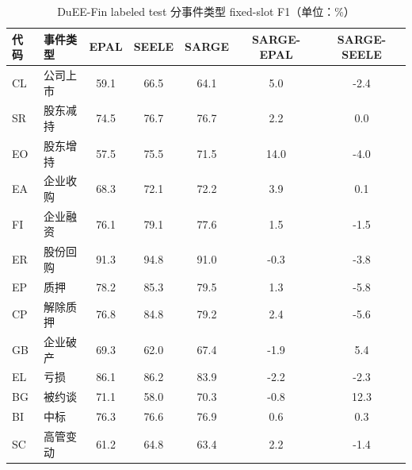 \begin{table}[htbp]
\centering
\caption{DuEE-Fin labeled test 分事件类型 fixed-slot F1（单位：\%）}
\label{tab:dueefin-events}
\small
\begin{tabular}{llSSSSS}
\toprule
代码 & 事件类型 & {EPAL} & {SEELE} & {SARGE} & {SARGE-EPAL} & {SARGE-SEELE} \\
\midrule
CL & 公司上市 & 59.1 & 66.5 & 64.1 & 5.0 & -2.4 \\
SR & 股东减持 & 74.5 & 76.7 & 76.7 & 2.2 & 0.0 \\
EO & 股东增持 & 57.5 & 75.5 & 71.5 & 14.0 & -4.0 \\
EA & 企业收购 & 68.3 & 72.1 & 72.2 & 3.9 & 0.1 \\
FI & 企业融资 & 76.1 & 79.1 & 77.6 & 1.5 & -1.5 \\
ER & 股份回购 & 91.3 & 94.8 & 91.0 & -0.3 & -3.8 \\
EP & 质押 & 78.2 & 85.3 & 79.5 & 1.3 & -5.8 \\
CP & 解除质押 & 76.8 & 84.8 & 79.2 & 2.4 & -5.6 \\
GB & 企业破产 & 69.3 & 62.0 & 67.4 & -1.9 & 5.4 \\
EL & 亏损 & 86.1 & 86.2 & 83.9 & -2.2 & -2.3 \\
BG & 被约谈 & 71.1 & 58.0 & 70.3 & -0.8 & 12.3 \\
BI & 中标 & 76.3 & 76.6 & 76.9 & 0.6 & 0.3 \\
SC & 高管变动 & 61.2 & 64.8 & 63.4 & 2.2 & -1.4 \\
\bottomrule
\end{tabular}
\end{table}

